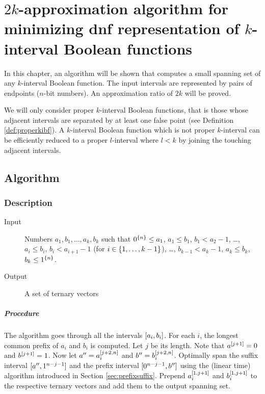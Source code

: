 \chapter{\texorpdfstring{$2k$}{2k}-approximation algorithm
for minimizing \texorpdfstring{\acrshort{dnf}}{DNF} representation
of \texorpdfstring{$k$}{k}-interval Boolean functions}
\label{chap:2kapprox}

In this chapter,
an algorithm will be shown that computes
a small spanning set
of any $k$-interval Boolean function.
The input intervals are represented by pairs of endpoints
($n$-bit numbers).
An approximation ratio of $2k$ will be proved.

We will only consider
proper $k$-interval Boolean functions,
that is those whose adjacent intervals are separated by
at least one false point
(see Definition \ref{def:properkibf}).
A $k$-interval Boolean function
which is not proper $k$-interval
can be efficiently reduced to a proper $l$-interval
where $l < k$
by joining the touching adjacent intervals.

\section{Algorithm}

\subsection{Description}

\begin{description}
\item[Input] Numbers $a_1, b_1, \ldots, a_k, b_k$
such that
$0^{\{n\}} \leq a_1$,
$a_1 \leq b_1$,
$b_1 < a_2 - 1$,
\ldots,
$a_i \leq b_i$,
$b_i < a_{i+1} - 1$
(for $i \in \{1, \ldots, k-1\}$),
\ldots,
$b_{k-1} < a_k - 1$,
$a_k \leq b_k$,
$b_k \leq 1^{\{n\}}$.

\item[Output] A set of ternary vectors
\end{description}

\paragraph{Procedure}
The algorithm goes through
all the intervals $[a_i, b_i]$.
For each $i$, the longest common prefix of $a_i$ and $b_i$
is computed. Let $j$ be its length.
Note that $a^{[j+1]} = 0$ and $b^{[j+1]} = 1$.
Now let $a'' = a_i^{[j+2, n]}$
and $b'' = b_i^{[j+2, n]}$.
Optimally span the suffix interval
$[a'', 1^{n-j-1}]$
and the prefix interval
$[0^{n-j-1}, b'']$
using the (linear time) algorithm
introduced in Section \ref{sec:prefixsuffix}.
Prepend $a_i^{[1, j+1]}$
and $b_i^{[1, j+1]}$
to the respective ternary vectors
and add them to the output spanning set.


